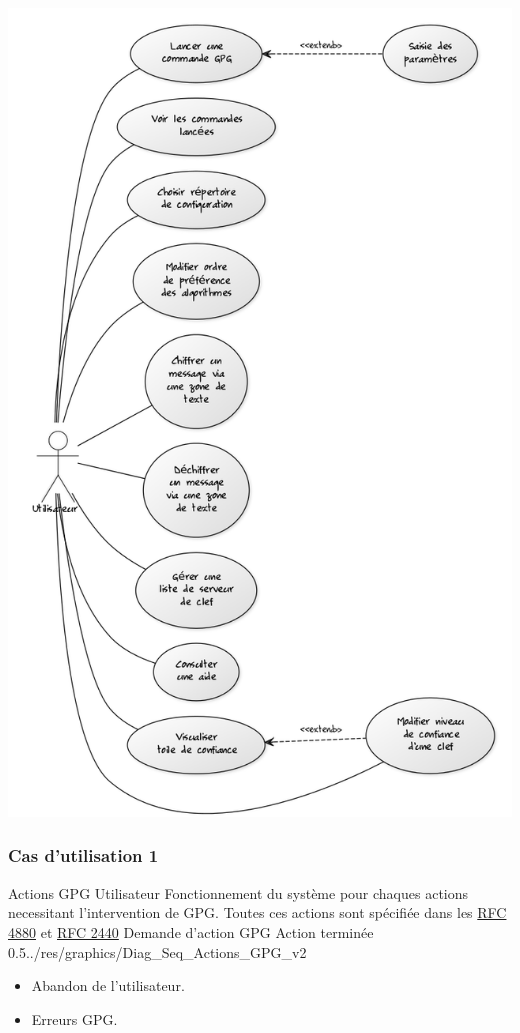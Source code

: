 \documentclass{../res/univ-projet}
\begin{document}
\includegraphics[scale=0.5]{../res/graphics/Diag_utilisation}
  \subsubsection{Cas d'utilisation 1}
\ficheGraphic
{Actions GPG}
{Utilisateur}
{
  Fonctionnement du système pour chaques actions
  necessitant l'intervention de GPG.
  Toutes ces actions sont spécifiée dans les
  \newline
  \href{file:../../ressources/openPGP/rfc4880-en.pdf}{RFC 4880}
  et \href{file:../../ressources/openPGP/rfc2440-fr.pdf}{RFC 2440}
}
{}
{Demande d'action GPG}
{Action terminée}
{0.5}{../res/graphics/Diag_Seq_Actions_GPG_v2}
{
  \begin{itemize}
  \item Abandon de l'utilisateur.
  \item Erreurs GPG.
  \end{itemize}
}
\vspace{0.5cm}
\end{document}

